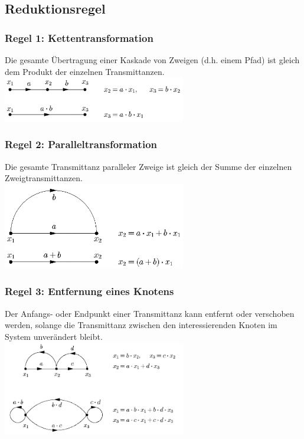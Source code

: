 	  \subsection{Reduktionsregel }
	    \begin{multicols}{2}
	    
	      \subsubsection{Regel 1: Kettentransformation }
		      Die gesamte Übertragung einer Kaskade von Zweigen (d.h. einem Pfad) ist gleich dem Produkt der einzelnen Transmittanzen. \\
		      \includegraphics[width=8cm]{./bilder/kettentransformation.png}
	      
	      \subsubsection{Regel 2: Paralleltransformation }
		      Die gesamte Transmittanz paralleler Zweige ist gleich der Summe der einzelnen Zweigtransmittanzen. \\
		      \includegraphics[width=8cm]{./bilder/paralleltransformation.png}
	      
	      \subsubsection{Regel 3: Entfernung eines Knotens }
		      Der Anfangs- oder Endpunkt einer Transmittanz kann entfernt oder verschoben werden, solange die Transmittanz zwischen den interessierenden Knoten im System unverändert bleibt. \\
		      \includegraphics[width=8cm]{./bilder/entfernungeinesknotens.png}


\end{multicols}
